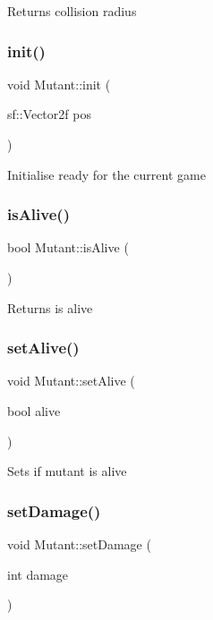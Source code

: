 Returns collision radius \mbox{\label{class_mutant_a43fe449ecbb708a19095cd030b399cee}} 
\subsubsection{\texorpdfstring{init()}{init()}}
{\footnotesize\ttfamily void Mutant\+::init (\begin{DoxyParamCaption}\item[{sf\+::\+Vector2f}]{pos }\end{DoxyParamCaption})}

Initialise ready for the current game \mbox{\label{class_mutant_ab92626e4168187b7bf49073e0626e071}} 
\subsubsection{\texorpdfstring{is\+Alive()}{isAlive()}}
{\footnotesize\ttfamily bool Mutant\+::is\+Alive (\begin{DoxyParamCaption}{ }\end{DoxyParamCaption})}

Returns is alive \mbox{\label{class_mutant_ae31d5187569549ce0c6346c8bef31bd4}} 
\subsubsection{\texorpdfstring{set\+Alive()}{setAlive()}}
{\footnotesize\ttfamily void Mutant\+::set\+Alive (\begin{DoxyParamCaption}\item[{bool}]{alive }\end{DoxyParamCaption})}

Sets if mutant is alive \mbox{\label{class_mutant_a7632057c37a56ed27df3d692b5357c6a}} 
\subsubsection{\texorpdfstring{set\+Damage()}{setDamage()}}
{\footnotesize\ttfamily void Mutant\+::set\+Damage (\begin{DoxyParamCaption}\item[{int}]{damage }\end{DoxyParamCaption})}

